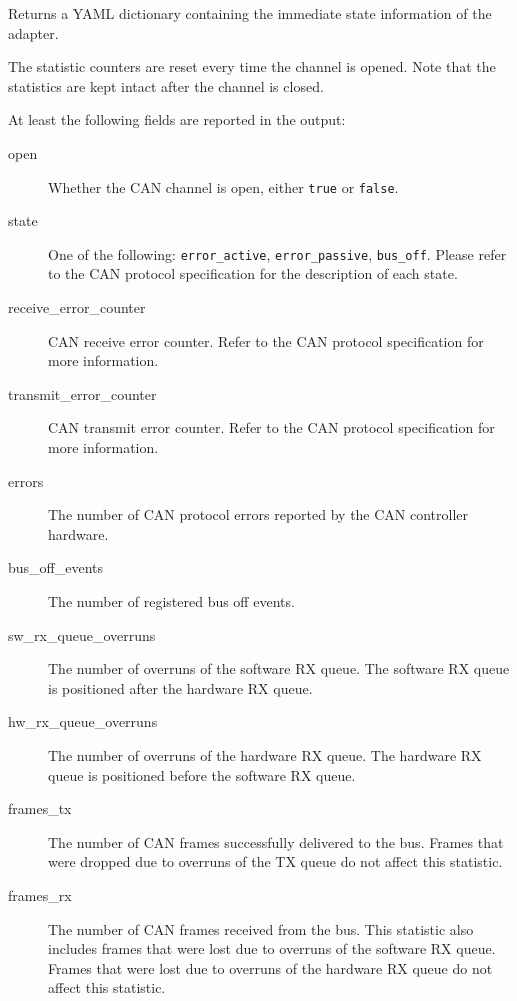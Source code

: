 \documentclass{zubaxdoc}
\begin{document}
Returns a YAML dictionary containing the immediate state information of the adapter.

The statistic counters are reset every time the channel is opened.
Note that the statistics are kept intact after the channel is closed.

At least the following fields are reported in the output:
\begin{description}
    \item[open] Whether the CAN channel is open, either \verb|true| or \verb|false|.

    \item[state] One of the following: \verb|error_active|, \verb|error_passive|, \verb|bus_off|.
                 Please refer to the CAN protocol specification for the description of each state.

    \item[receive\_error\_counter] CAN receive error counter.
                                   Refer to the CAN protocol specification for more information.

    \item[transmit\_error\_counter] CAN transmit error counter.
                                    Refer to the CAN protocol specification for more information.

    \item[errors] The number of CAN protocol errors reported by the CAN controller hardware.

    \item[bus\_off\_events] The number of registered bus off events.

    \item[sw\_rx\_queue\_overruns] The number of overruns of the software RX queue.
                                   The software RX queue is positioned after the hardware RX queue.

    \item[hw\_rx\_queue\_overruns] The number of overruns of the hardware RX queue.
                                   The hardware RX queue is positioned before the software RX queue.

    \item[frames\_tx] The number of CAN frames successfully delivered to the bus.
                      Frames that were dropped due to overruns of the TX queue do not affect this statistic.

    \item[frames\_rx] The number of CAN frames received from the bus.
                      This statistic also includes frames that were lost due to overruns of the software RX queue.
                      Frames that were lost due to overruns of the hardware RX queue do not affect this statistic.


\end{description}
\end{document}

